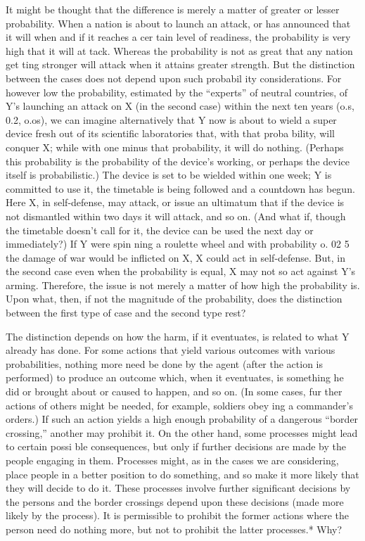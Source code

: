 \documentclass[11pt,openany]{book}
\begin{document}
It might be thought that the difference is merely a matter of greater or lesser probability. When a nation is about to launch an attack, or has announced that it will when and if it reaches a cer tain level of readiness, the probability is very high that it will at tack. Whereas the probability is not as great that any nation get ting stronger will attack when it attains greater strength. But the distinction between the cases does not depend upon such probabil ity considerations. For however low the probability, estimated by the ``experts'' of neutral countries, of Y's launching an attack on X (in the second case) within the next ten years (o.s, 0.2, o.os), we can imagine alternatively that Y now is about to wield a super device fresh out of its scientific laboratories that, with that proba bility, will conquer X; while with one minus that probability, it will do nothing. (Perhaps this probability is the probability of the device's working, or perhaps the device itself is probabilistic.) The device is set to be wielded within one week; Y is committed to use it, the timetable is being followed and a countdown has begun. Here X, in self-defense, may attack, or issue an ultimatum that if the device is not dismantled within two days it will attack, and so on. (And what if, though the timetable doesn't call for it, the device can be used the next day or immediately?) If Y were spin ning a roulette wheel and with probability o. 02 5 the damage of war would be inflicted on X, X could act in self-defense. But, in the second case even when the probability is equal, X may not so act against Y's arming. Therefore, the issue is not merely a matter of how high the probability is. Upon what, then, if not the magnitude of the probability, does the distinction between the first type of case and the second type rest? 

The distinction depends on how the harm, if it eventuates, is related to what Y already has done. For some actions that yield various outcomes with various probabilities, nothing more need be done by the agent (after the action is performed) to produce an outcome which, when it eventuates, is something he did or brought about or caused to happen, and so on. (In some cases, fur ther actions of others might be needed, for example, soldiers obey ing a commander's orders.) If such an action yields a high enough probability of a dangerous ``border crossing,'' another may prohibit it. On the other hand, some processes might lead to certain possi ble consequences, but only if further decisions are made by the people engaging in them. Processes might, as in the cases we are considering, place people in a better position to do something, and so make it more likely that they will decide to do it. These processes involve further significant decisions by the persons and the border crossings depend upon these decisions (made more likely by the process). It is permissible to prohibit the former actions where the person need do nothing more, but not to prohibit the latter processes.* Why? 
\end{document}
